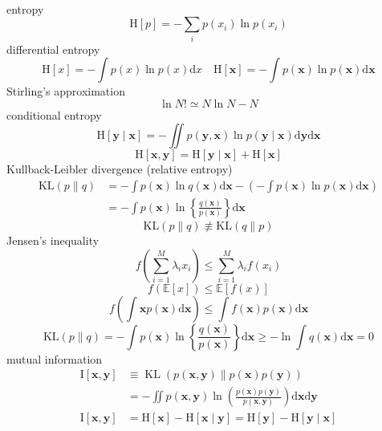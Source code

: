 \documentclass{article}
\begin{document}
	${}$\\
	entropy
	$$
	\mathrm{H}[p]=-\sum_{i} p\left(x_{i}\right) \ln p\left(x_{i}\right)
	$$
	differential entropy
	$$
	\mathrm{H}[x]=-\int p(x) \ln p(x) \mathrm{d} x\quad \mathrm{H}[\mathbf{x}]=-\int p(\mathbf{x}) \ln p(\mathbf{x}) \mathrm{d} \mathbf{x}
	$$
	Stirling’s approximation
	$$
	\ln N ! \simeq N \ln N-N
	$$
	conditional entropy
	$$
	\mathrm{H}[\mathbf{y} \mid \mathbf{x}]=-\iint p(\mathbf{y}, \mathbf{x}) \ln p(\mathbf{y} \mid \mathbf{x}) \mathrm{d} \mathbf{y} \mathrm{d} \mathbf{x}
	$$
	$$
	\mathrm{H}[\mathbf{x}, \mathbf{y}]=\mathrm{H}[\mathbf{y} \mid \mathbf{x}]+\mathrm{H}[\mathbf{x}]
	$$
	Kullback-Leibler divergence (relative entropy)
	$$
	\begin{aligned}
	\mathrm{KL}(p \| q) &=-\int p(\mathbf{x}) \ln q(\mathbf{x}) \mathrm{d} \mathbf{x}-\left(-\int p(\mathbf{x}) \ln p(\mathbf{x}) \mathrm{d} \mathbf{x}\right) \\
	&=-\int p(\mathbf{x}) \ln \left\{\frac{q(\mathbf{x})}{p(\mathbf{x})}\right\} \mathrm{d} \mathbf{x} 
	\end{aligned}
	$$
	$$
	\mathrm{KL}(p \| q) \not \equiv \mathrm{KL}(q \| p)
	$$
	Jensen’s inequality
	$$
	f\left(\sum_{i=1}^{M} \lambda_{i} x_{i}\right) \leqslant \sum_{i=1}^{M} \lambda_{i} f\left(x_{i}\right)
	$$
	$$
	f(\mathbb{E}[x]) \leqslant \mathbb{E}[f(x)]
	$$
	$$
	f\left(\int \mathbf{x} p(\mathbf{x}) \mathrm{d} \mathbf{x}\right) \leqslant \int f(\mathbf{x}) p(\mathbf{x}) \mathrm{d} \mathbf{x}
	$$
	$$
	\mathrm{KL}(p \| q)=-\int p(\mathbf{x}) \ln \left\{\frac{q(\mathbf{x})}{p(\mathbf{x})}\right\} \mathrm{d} \mathbf{x} \geqslant-\ln \int q(\mathbf{x}) \mathrm{d} \mathbf{x}=0
	$$
	mutual information
	$$
	\begin{aligned}
	\mathrm{I}[\mathbf{x}, \mathbf{y}] & \equiv \operatorname{KL}(p(\mathbf{x}, \mathbf{y}) \| p(\mathbf{x}) p(\mathbf{y})) \\
	&=-\iint p(\mathbf{x}, \mathbf{y}) \ln \left(\frac{p(\mathbf{x}) p(\mathbf{y})}{p(\mathbf{x}, \mathbf{y})}\right) \mathrm{d} \mathbf{x} \mathrm{d} \mathbf{y} \\
	\mathrm{I}[\mathbf{x}, \mathbf{y}]&=\mathrm{H}[\mathbf{x}]-\mathrm{H}[\mathbf{x} \mid \mathbf{y}]=\mathrm{H}[\mathbf{y}]-\mathrm{H}[\mathbf{y} \mid \mathbf{x}]
	\end{aligned}
	$$
	
	\pagebreak
\end{document}
